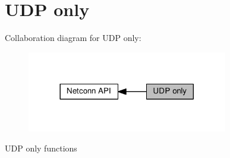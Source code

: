 \hypertarget{group__netconn__udp}{}\section{U\+DP only}
\label{group__netconn__udp}
Collaboration diagram for U\+DP only\+:
\nopagebreak
\begin{figure}[H]
\begin{center}
\leavevmode
\includegraphics[width=248pt]{group__netconn__udp}
\end{center}
\end{figure}
U\+DP only functions 